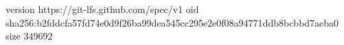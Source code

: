 version https://git-lfs.github.com/spec/v1
oid sha256:b2fddcfa57fd74e0d9f26ba99dea545cc295e2e0f08a94771ddb8bcbbd7aeba0
size 349692
